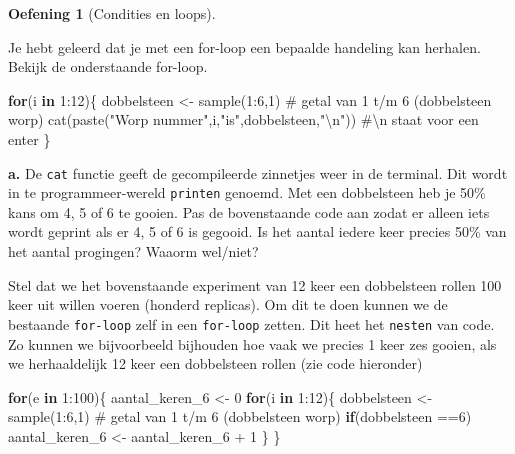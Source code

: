 \documentclass[
  a4paper,
]{scrbook}
\newenvironment{Shaded}{\begin{snugshade}}{\end{snugshade}}
\newcommand{\CommentTok}[1]{\textcolor[rgb]{0.37,0.37,0.37}{#1}}
\newcommand{\ControlFlowTok}[1]{\textcolor[rgb]{0.00,0.23,0.31}{\textbf{#1}}}
\newcommand{\DecValTok}[1]{\textcolor[rgb]{0.68,0.00,0.00}{#1}}
\newcommand{\FunctionTok}[1]{\textcolor[rgb]{0.28,0.35,0.67}{#1}}
\newcommand{\NormalTok}[1]{\textcolor[rgb]{0.00,0.23,0.31}{#1}}
\newcommand{\OtherTok}[1]{\textcolor[rgb]{0.00,0.23,0.31}{#1}}
\newcommand{\SpecialCharTok}[1]{\textcolor[rgb]{0.37,0.37,0.37}{#1}}
\newcommand{\StringTok}[1]{\textcolor[rgb]{0.13,0.47,0.30}{#1}}
\theoremstyle{definition}
\newtheorem{exercise}{Oefening}[chapter]
\theoremstyle{remark}
\begin{document}
\begin{exercise}[Condities en
loops]\protect\hypertarget{exr-R-4}{}\label{exr-R-4}

Je hebt geleerd dat je met een for-loop een bepaalde handeling kan
herhalen. Bekijk de onderstaande for-loop.

\begin{Shaded}
\begin{Highlighting}[]
\ControlFlowTok{for}\NormalTok{(i }\ControlFlowTok{in} \DecValTok{1}\SpecialCharTok{:}\DecValTok{12}\NormalTok{)\{}
\NormalTok{  dobbelsteen }\OtherTok{\textless{}{-}} \FunctionTok{sample}\NormalTok{(}\DecValTok{1}\SpecialCharTok{:}\DecValTok{6}\NormalTok{,}\DecValTok{1}\NormalTok{) }\CommentTok{\# getal van 1 t/m 6 (dobbelsteen worp)}
  \FunctionTok{cat}\NormalTok{(}\FunctionTok{paste}\NormalTok{(}\StringTok{"Worp nummer"}\NormalTok{,i,}\StringTok{"is"}\NormalTok{,dobbelsteen,}\StringTok{"}\SpecialCharTok{\textbackslash{}n}\StringTok{"}\NormalTok{)) }\CommentTok{\#\textbackslash{}n staat voor een \textquotesingle{}enter\textquotesingle{}}
\NormalTok{\}}
\end{Highlighting}
\end{Shaded}

\textbf{a.} De \texttt{cat} functie geeft de gecompileerde zinnetjes
weer in de terminal. Dit wordt in te programmeer-wereld \texttt{printen}
genoemd. Met een dobbelsteen heb je 50\% kans om 4, 5 of 6 te gooien.
Pas de bovenstaande code aan zodat er alleen iets wordt geprint als er
4, 5 of 6 is gegooid. Is het aantal iedere keer precies 50\% van het
aantal progingen? Waaorm wel/niet?

Stel dat we het bovenstaande experiment van 12 keer een dobbelsteen
rollen 100 keer uit willen voeren (honderd replicas). Om dit te doen
kunnen we de bestaande \texttt{for-loop} zelf in een \texttt{for-loop}
zetten. Dit heet het \texttt{nesten} van code. Zo kunnen we bijvoorbeeld
bijhouden hoe vaak we precies 1 keer zes gooien, als we herhaaldelijk 12
keer een dobbelsteen rollen (zie code hieronder)

\begin{Shaded}
\begin{Highlighting}[]
\ControlFlowTok{for}\NormalTok{(e }\ControlFlowTok{in} \DecValTok{1}\SpecialCharTok{:}\DecValTok{100}\NormalTok{)\{}
\NormalTok{  aantal\_keren\_6 }\OtherTok{\textless{}{-}} \DecValTok{0}
  \ControlFlowTok{for}\NormalTok{(i }\ControlFlowTok{in} \DecValTok{1}\SpecialCharTok{:}\DecValTok{12}\NormalTok{)\{}
\NormalTok{    dobbelsteen }\OtherTok{\textless{}{-}} \FunctionTok{sample}\NormalTok{(}\DecValTok{1}\SpecialCharTok{:}\DecValTok{6}\NormalTok{,}\DecValTok{1}\NormalTok{) }\CommentTok{\# getal van 1 t/m 6 (dobbelsteen worp)}
    \ControlFlowTok{if}\NormalTok{(dobbelsteen }\SpecialCharTok{==}\DecValTok{6}\NormalTok{) aantal\_keren\_6 }\OtherTok{\textless{}{-}}\NormalTok{ aantal\_keren\_6 }\SpecialCharTok{+} \DecValTok{1}
\NormalTok{  \}}
\NormalTok{\}}
\end{Highlighting}
\end{Shaded}


\end{exercise}
\end{document}
